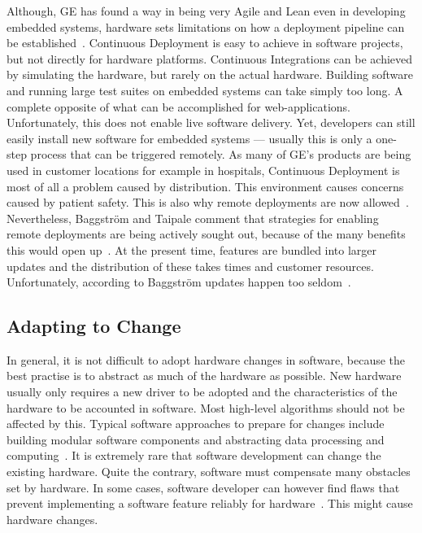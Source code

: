 \documentclass[english]{tktltiki2}
\begin{document}
Although, GE has found a way in being very Agile and Lean even in developing embedded systems, hardware sets limitations on how a deployment pipeline can be established~\cite{BT15}. Continuous Deployment is easy to achieve in software projects, but not directly for hardware platforms. Continuous Integrations can be achieved by simulating the hardware, but rarely on the actual hardware. Building software and running large test suites on embedded systems can take simply too long. A complete opposite of what can be accomplished for web-applications. Unfortunately, this does not enable live software delivery. Yet, developers can still easily install new software for embedded systems — usually this is only a one-step process that can be triggered remotely. As many of GE’s products are being used in customer locations for example in hospitals, Continuous Deployment is most of all a problem caused by distribution. This environment causes concerns caused by patient safety. This is also why remote deployments are now allowed~\cite{BT15}. Nevertheless, Baggström and Taipale comment that strategies for enabling remote deployments are being actively sought out, because of the many benefits this would open up~\cite{BT15}. At the present time, features are bundled into larger updates and the distribution of these takes times and customer resources. Unfortunately, according to Baggström updates happen too seldom~\cite{BT15}.

\subsection{Adapting to Change}

In general, it is not difficult to adopt hardware changes in software, because the best practise is to abstract as much of the hardware as possible. New hardware usually only requires a new driver to be adopted and the characteristics of the hardware to be accounted in software. Most high-level algorithms should not be affected by this. Typical software approaches to prepare for changes include building modular software components and abstracting data processing and computing~\cite{BT15, Hol15a, Hol15b, Koi15, Kri15, Pet15}. It is extremely rare that software development can change the existing hardware. Quite the contrary, software must compensate many obstacles set by hardware. In some cases, software developer can however find flaws that prevent implementing a software feature reliably for hardware~\cite{Hol15b}. This might cause hardware changes.
\end{document}
